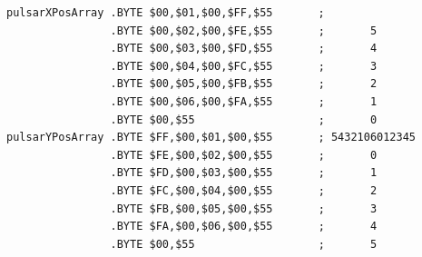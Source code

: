 \begin{lstlisting}
pulsarXPosArray .BYTE $00,$01,$00,$FF,$55       ;
                .BYTE $00,$02,$00,$FE,$55       ;       5      
                .BYTE $00,$03,$00,$FD,$55       ;       4      
                .BYTE $00,$04,$00,$FC,$55       ;       3      
                .BYTE $00,$05,$00,$FB,$55       ;       2      
                .BYTE $00,$06,$00,$FA,$55       ;       1      
                .BYTE $00,$55                   ;       0      
pulsarYPosArray .BYTE $FF,$00,$01,$00,$55       ; 5432106012345
                .BYTE $FE,$00,$02,$00,$55       ;       0      
                .BYTE $FD,$00,$03,$00,$55       ;       1      
                .BYTE $FC,$00,$04,$00,$55       ;       2      
                .BYTE $FB,$00,$05,$00,$55       ;       3      
                .BYTE $FA,$00,$06,$00,$55       ;       4      
                .BYTE $00,$55                   ;       5      
\end{lstlisting}


